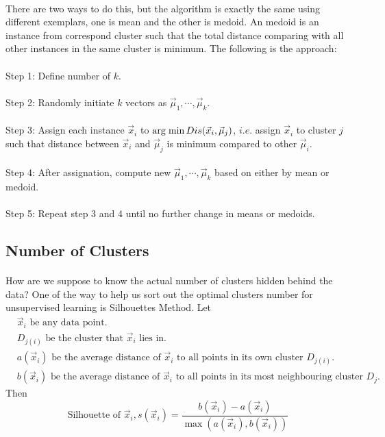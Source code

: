 \documentclass{article}
\begin{document}
\paragraph{}
There are two ways to do this, but the algorithm is exactly the same using different exemplars, one is mean and the other is medoid. An medoid is an instance from correspond cluster such that the total distance comparing with all other instances in the same cluster is minimum. The following is the approach:
\paragraph{}
Step 1: Define number of $k$.
\paragraph{}
Step 2: Randomly initiate $k$ vectors as $\Vec{\mu}_1, \cdots, \Vec{\mu}_k$.
\paragraph{}
Step 3: Assign each instance $\Vec{x}_i$ to $\operatorname*{arg \hspace{1mm} min} Dis(\Vec{x}_i, \Vec{\mu}_j)$, $i.e.$ assign $\Vec{x}_i$ to cluster $j$ such that distance between $\Vec{x}_i$ and 
$\Vec{\mu}_j$ is minimum compared to other $\Vec{\mu}_i$.
\paragraph{}
Step 4: After assignation, compute new $\Vec{\mu}_1, \cdots, \Vec{\mu}_k$ based on either by mean or medoid.
\paragraph{}
Step 5: Repeat step 3 and 4 until no further change in means or medoids.

\subsection{Number of Clusters}
\paragraph{}
How are we suppose to know the actual number of clusters hidden behind the data? One of the way to help us sort out the optimal clusters number for unsupervised learning is Silhouettes Method. Let
\begin{align*}
    &\Vec{x}_i \text{ be any data point.} \\
    &D_{j(i)} \text{ be the cluster that } \Vec{x}_i \text{ lies in.} \\
    &a(\Vec{x}_i) \text{ be the average distance of } \Vec{x}_i  \text{ to all points in its own cluster } D_{j(i)}. \\
    &b(\Vec{x}_i) \text{ be the average distance of } \Vec{x}_i  \text{ to all points in its most neighbouring cluster } D_{j}.
\end{align*}
Then
\begin{equation*}
    \text{Silhouette of } \Vec{x}_i, s(\Vec{x}_i) = 
    \frac{b(\Vec{x}_i)-a(\Vec{x}_i)}{\max(a(\Vec{x}_i),b(\Vec{x}_i))} 
\end{equation*}
\end{document}

